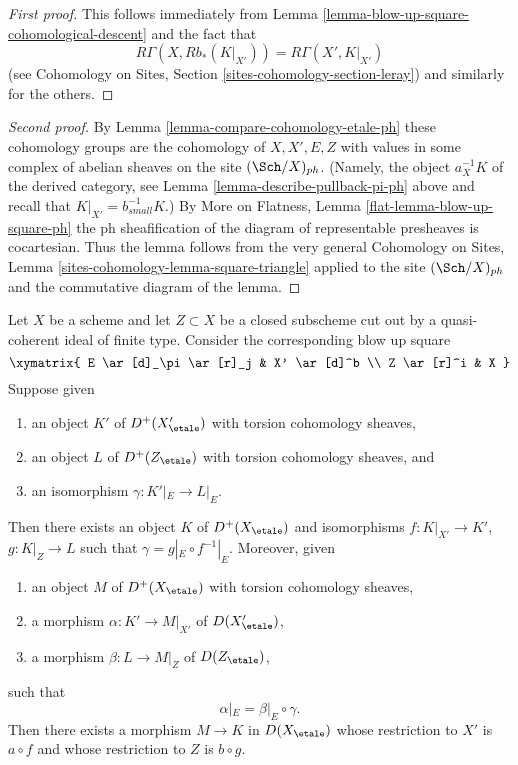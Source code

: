 \begin{proof}[First proof]
This follows immediately from
Lemma \ref{lemma-blow-up-square-cohomological-descent}
and the fact that
$$
R\Gamma(X, Rb_*(K|_{X'})) = R\Gamma(X', K|_{X'})
$$
(see Cohomology on Sites, Section \ref{sites-cohomology-section-leray})
and similarly for the others.
\end{proof}

\begin{proof}[Second proof]
By Lemma \ref{lemma-compare-cohomology-etale-ph}
these cohomology groups are the cohomology of
$X, X', E, Z$ with values in some complex of abelian sheaves
on the site $(\Sch/X)_{ph}$. (Namely, the object
$a_X^{-1}K$ of the derived category, see
Lemma \ref{lemma-describe-pullback-pi-ph} above
and recall that $K|_{X'} = b_{small}^{-1}K$.)
By More on Flatness, Lemma \ref{flat-lemma-blow-up-square-ph}
the ph sheafification of the diagram of representable
presheaves is cocartesian. Thus the lemma follows from the very general
Cohomology on Sites, Lemma \ref{sites-cohomology-lemma-square-triangle}
applied to the site $(\Sch/X)_{ph}$ and the commutative diagram
of the lemma.
\end{proof}

\begin{lemma}
\label{lemma-blow-up-square-equivalence}
Let $X$ be a scheme and let $Z \subset X$ be a closed subscheme
cut out by a quasi-coherent ideal of finite type. Consider the
corresponding blow up square
$$
\xymatrix{
E \ar[d]_\pi \ar[r]_j & X' \ar[d]^b \\
Z \ar[r]^i & X
}
$$
Suppose given
\begin{enumerate}
\item an object $K'$ of $D^+(X'_\etale)$ with torsion cohomology sheaves,
\item an object $L$ of $D^+(Z_\etale)$ with torsion cohomology sheaves, and
\item an isomorphism $\gamma : K'|_E \to L|_E$.
\end{enumerate}
Then there exists an object $K$ of $D^+(X_\etale)$
and isomorphisms $f : K|_{X'} \to K'$, $g : K|_Z \to L$ such
that $\gamma = g|_E \circ f^{-1}|_E$.
Moreover, given
\begin{enumerate}
\item an object $M$ of $D^+(X_\etale)$ with torsion cohomology sheaves,
\item a morphism $\alpha : K' \to M|_{X'}$ of $D(X'_\etale)$,
\item a morphism $\beta : L \to M|_Z$ of $D(Z_\etale)$,
\end{enumerate}
such that
$$
\alpha|_E  = \beta|_E \circ \gamma.
$$
Then there exists a morphism $M \to K$ in $D(X_\etale)$
whose restriction to $X'$ is $a \circ f$
and whose restriction to $Z$ is $b \circ g$.
\end{lemma}

